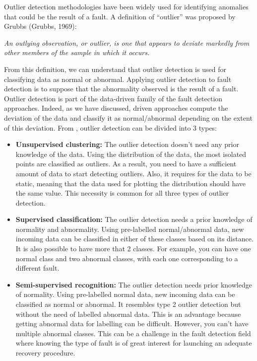 Outlier detection methodologies have been widely used for identifying anomalies that could be the result of a fault. A definition of “outlier” was proposed by Grubbs (Grubbs, 1969): 

\begin{center}
\textit{An outlying observation, or outlier, is one that appears to deviate
markedly from other members of the sample in which it occurs.}
\end{center} 

From this definition, we can understand that outlier detection is used for classifying data as normal or abnormal. Applying outlier detection to fault detection is to suppose that the abnormality observed is the result of a fault. Outlier detection is part of the data-driven family of the fault detection approaches.  Indeed, as we have discussed, driven approaches compute the deviation of the data and classify it as normal/abnormal depending on the extent of this deviation. From \cite{hodge2004survey}, outlier detection can be divided into 3 types: 

\begin{itemize}
    \item \textbf{Unsupervised clustering:} The outlier detection doesn’t need any prior knowledge of the data. Using the distribution of the data, the most isolated points are classified as outliers. As a result, you need to have a sufficient amount of data to start detecting outliers. Also, it requires for the data to be static, meaning that the data used for plotting the distribution should have the same value. This necessity is common for all three types of outlier detection.
    \item \textbf{Supervised classification:} The outlier detection needs a prior knowledge of normality and abnormality. Using pre-labelled normal/abnormal data, new incoming data can be classified in either of these classes based on its distance. It is also possible to have more that 2 classes. For example, you can have one normal class and two abnormal classes, with each one corresponding to a different fault. 
    \item \textbf{Semi-supervised recognition:} The outlier detection needs prior knowledge of normality. Using pre-labelled normal data, new incoming data can be classified as normal or abnormal. It resembles type 2 outlier detection but without the need of labelled abnormal data. This is an advantage because getting abnormal data for labelling can be difficult. However, you can’t have multiple abnormal classes. This can be a challenge in the fault detection field where knowing the type of fault is of great interest for launching an adequate recovery procedure.
\end{itemize}


